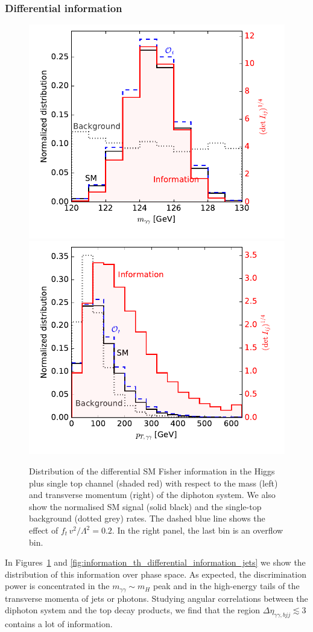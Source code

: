 \subsubsection{Differential information}

\begin{figure}
  \includegraphics[width=0.49 \textwidth]{fig/information/th_information_over_maa}%
  \includegraphics[width=0.49 \textwidth]{fig/information/th_information_over_ptaa}%
  \caption{Distribution of the differential SM Fisher information in
    the Higgs plus single top channel (shaded red) with respect to the
    mass (left) and transverse momentum (right) of the diphoton
    system. We also show the normalised SM signal (solid black) and
    the single-top background (dotted grey) rates. The dashed blue
    line shows the effect of $f_{t} \, v^2 / \Lambda^2 = 0.2$. In the
    right panel, the last bin is an overflow bin.}
  \label{fig:information_th_differential_information_photons}
\end{figure}

In Figures~\ref{fig:information_th_differential_information_photons}
and \ref{fig:information_th_differential_information_jets} we show the
distribution of this information over phase space. As expected, the
discrimination power is concentrated in the
$m_{\gamma \gamma} \sim m_H$ peak and in the high-energy tails of the
transverse momenta of jets or photons. Studying angular correlations
between the diphoton system and the top decay products, we find that the
region $\Delta \eta_{ \gamma \gamma, bjj} \lesssim 3$ contains a lot
of information.

